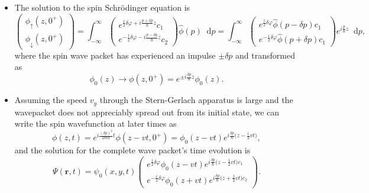 \documentclass[11pt, a4paper]{article}
\newcommand{\diff}{\mathop{}\!\mathrm{d}} %
\newcommand{\Schro}{Schr\"{o}dinger\xspace}
\newcommand{\SG}{Stern-Gerlach\xspace}
\renewcommand{\vec}[1]{\bm{#1}}  %
\newcommand{\F}[1]{\widehat{#1}} %
\newcommand{\ua}{\uparrow}  %
\newcommand{\da}{\downarrow}  %
\renewcommand{\r}{\vec{r}}  %
\begin{document}
\begin{itemize}
    \item The solution to the spin \Schro equation is
    \begin{equation*}
        \begin{pmatrix}
            \phi_{\ua}(z, 0^{+})\\
            \phi_{\da}(z, 0^{+})
        \end{pmatrix}
        = \int_{-\infty}^{\infty}
        \begin{pmatrix}
            e^{\frac{i}{2}\delta\varphi + i \frac{p + \delta p}{\hbar}z}c_{1}\\
            e^{-\frac{i}{2}\delta\varphi - i \frac{p - \delta p}{\hbar}z}c_{2}
        \end{pmatrix}
        \F{\phi}(p)\diff p
        = \int_{-\infty}^{\infty}
        \begin{pmatrix}
            e^{\frac{i}{2}\delta\varphi}\F{\phi}(p - \delta p)c_{1}\\
            e^{-\frac{i}{2}\delta\varphi}\F{\phi}(p + \delta p)c_{1}
        \end{pmatrix} 
        e^{i \frac{p}{\hbar}z}\diff p,
    \end{equation*}
    where the spin wave packet has experienced an impulse $ \pm \delta p $ and transformed as
    \begin{equation*}
        \phi_{0}(z) \to \phi(z, 0^{+}) = e^{\pm i \frac{\delta p}{\hbar}z}\phi_{0}(z).
    \end{equation*}
    
    \item Assuming the speed $ v_{y} $ through the \SG apparatus is large and the wavepacket does not appreciably spread out from its initial state, we can write the spin wavefunction at later times as
    \begin{equation*}
        \phi(z, t) = e^{ i \frac{(\delta p)^{2}}{2m \hbar}t} \phi(z - vt, 0^{+}) = \phi_{0}(z - vt)e^{i \frac{\delta p}{\hbar}\big( z - \frac{1}{2}vt \big)},
    \end{equation*}
    and the solution for the complete wave packet's time evolution is
    \begin{equation*}
        \Psi(\r, t) = \psi_{0}(x, y, t)
        \begin{pmatrix}
            e^{\frac{i}{2}\delta \varphi}\phi_{0}(z - vt)e^{i \frac{\delta p}{\hbar}\big( z - \frac{1}{2}vt \big)c_{1}}\\
            e^{-\frac{i}{2}\delta \varphi}\phi_{0}(z + vt)e^{i \frac{\delta p}{\hbar}\big( z + \frac{1}{2}vt \big)c_{2}}
        \end{pmatrix}.
    \end{equation*}
    
\end{itemize}
\end{document}
